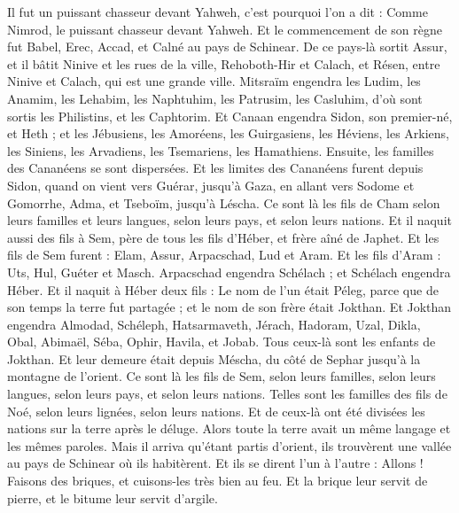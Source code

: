 \begin{multicols}{2}
Il fut un puissant chasseur devant Yahweh, c'est pourquoi l'on a dit : Comme Nimrod, le puissant chasseur devant Yahweh.
Et le commencement de son règne fut Babel, Erec, Accad, et Calné au pays de Schinear.
De ce pays-là sortit Assur, et il bâtit Ninive et les rues de la ville, Rehoboth-Hir et Calach,
et Résen, entre Ninive et Calach, qui est une grande ville.
Mitsraïm engendra les Ludim, les Anamim, les Lehabim, les Naphtuhim,
les Patrusim, les Casluhim, d'où sont sortis les Philistins, et les Caphtorim.
Et Canaan engendra Sidon, son premier-né, et Heth ;
et les Jébusiens, les Amoréens, les Guirgasiens,
les Héviens, les Arkiens, les Siniens,
les Arvadiens, les Tsemariens, les Hamathiens. Ensuite, les familles des Cananéens se sont dispersées.
Et les limites des Cananéens furent depuis Sidon, quand on vient vers Guérar, jusqu'à Gaza, en allant vers Sodome et Gomorrhe, Adma, et Tseboïm, jusqu'à Léscha.
Ce sont là les fils de Cham selon leurs familles et leurs langues, selon leurs pays, et selon leurs nations.
Et il naquit aussi des fils à Sem, père de tous les fils d'Héber, et frère aîné de Japhet.
Et les fils de Sem furent : Elam, Assur, Arpacschad, Lud et Aram.
Et les fils d'Aram : Uts, Hul, Guéter et Masch.
Arpacschad engendra Schélach ; et Schélach engendra Héber.
Et il naquit à Héber deux fils : Le nom de l'un était Péleg, parce que de son temps la terre fut partagée ; et le nom de son frère était Jokthan.
Et Jokthan engendra Almodad, Schéleph, Hatsarmaveth, Jérach,
Hadoram, Uzal, Dikla,
Obal, Abimaël, Séba,
Ophir, Havila, et Jobab. Tous ceux-là sont les enfants de Jokthan.
Et leur demeure était depuis Méscha, du côté de Sephar jusqu'à la montagne de l'orient.
Ce sont là les fils de Sem, selon leurs familles, selon leurs langues, selon leurs pays, et selon leurs nations.
Telles sont les familles des fils de Noé, selon leurs lignées, selon leurs nations. Et de ceux-là ont été divisées les nations sur la terre après le déluge.
\VerseOne{}Alors toute la terre avait un même langage et les mêmes paroles.
Mais il arriva qu'étant partis d'orient, ils trouvèrent une vallée au pays de Schinear où ils habitèrent.
Et ils se dirent l'un à l'autre : Allons ! Faisons des briques, et cuisons-les très bien au feu. Et la brique leur servit de pierre, et le bitume leur servit d'argile.

\end{multicols}
